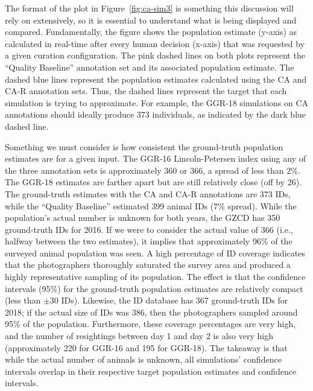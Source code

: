 The format of the plot in Figure~\ref{fig:ca-sim3} is something this discussion will rely on extensively, so it is essential to understand what is being displayed and compared.  Fundamentally, the figure shows the population estimate (y-axis) as calculated in real-time after every human decision (x-axis) that was requested by a given curation configuration.  The pink dashed lines on both plots represent the ``Quality Baseline'' annotation set and its associated population estimate.  The dashed blue lines represent the population estimates calculated using the CA and CA-R annotation sets.  Thus, the dashed lines represent the target that each simulation is trying to approximate.  For example, the GGR-18 simulations on CA annotations should ideally produce 373 individuals, as indicated by the dark blue dashed line.

Something we must consider is how consistent the ground-truth population estimates are for a given input.  The GGR-16 Lincoln-Petersen index using any of the three annotation sets is approximately 360 or 366, a spread of less than 2\%.  The GGR-18 estimates are farther apart but are still relatively close (off by 26).  The ground-truth estimates with the CA and CA-R annotations are 373 IDs, while the ``Quality Baseline'' estimated 399 animal IDs (7\% spread).  While the population's actual number is unknown for both years, the GZCD has 350 ground-truth IDs for 2016.  If we were to consider the actual value of 366 (i.e., halfway between the two estimates), it implies that approximately 96\% of the surveyed animal population was seen.  A high percentage of ID coverage indicates that the photographers thoroughly saturated the survey area and produced a highly representative sampling of its population.  The effect is that the confidence intervals (95\%) for the ground-truth population estimates are relatively compact (less than $\pm$30 IDs).  Likewise, the ID database has 367 ground-truth IDs for 2018; if the actual size of IDs was 386, then the photographers sampled around 95\% of the population.  Furthermore, these coverage percentages are very high, and the number of resightings between day 1 and day 2 is also very high (approximately 220 for GGR-16 and 195 for GGR-18).  The takeaway is that while the actual number of animals is unknown, all simulations' confidence intervals overlap in their respective target population estimates and confidence intervals.

